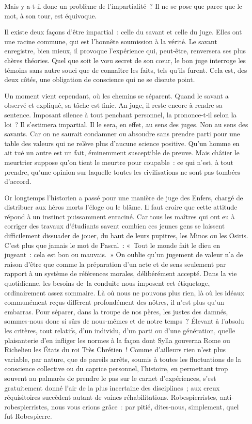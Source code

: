 \documentclass[french,twoside]{book} %
\begin{document}
\noindent  {}
\label{p69} Mais y a‑t‑il donc un problème de l’impartialité ? Il ne se pose que parce que le mot, à son tour, est équivoque.\par
Il existe deux façons d’être impartial : celle du savant et celle du juge. Elles ont une racine commune, qui est l’honnête soumission à la vérité. Le savant enregistre, bien mieux, il provoque l’expérience qui, peut‑être, renversera ses plus chères théories. Quel que soit le vœu secret de son cœur, le bon juge interroge les témoins sans autre souci que de connaître les faits, tels qu’ils furent. Cela est, des deux côtés, une obligation de conscience qui ne se discute point.\par
Un moment vient cependant, où les chemins se séparent. Quand le savant a observé et expliqué, sa tâche est finie. An juge, il reste encore à rendre sa sentence. Imposant silence à tout penchant personnel, la prononce‑t‑il selon la loi ? Il s’estimera impartial. Il le sera, en effet, au sens des juges. Non au sens des savants. Car on ne saurait condamner ou absoudre sans prendre parti pour une table des valeurs qui ne relève  
\label{p70} plus d’aucune science positive. Qu’un homme en ait tué un autre est un fait, éminemment susceptible de preuve. Mais châtier le meurtrier sup­pose qu’on tient le meurtre pour coupable : ce qui n’est, à tout prendre, qu’une opinion sur laquelle toutes les civilisations ne sont pas tombées d’accord.\par
Or longtemps l’historien a passé pour une manière de juge des Enfers, chargé de distribuer aux héros morts l’éloge ou le blâme. Il faut croire que cette attitude répond à un instinct puissamment enraciné. Car tous les maîtres qui ont eu à corriger des travaux d’étudiants savent combien ces jeunes gens se laissent difficilement dissuader de jouer, du haut de leurs pupitres, les Minos ou les Osiris. C’est plus que jamais le mot de Pascal : « Tout le monde fait le dieu en jugeant : cela est bon ou mauvais. » On oublie qu’un jugement de valeur n’a de raison d’être que comme la préparation d’un acte et de sens seulement par rapport à un système de références morales, délibérément accepté. Dans la vie quotidienne, les besoins de la conduite nous imposent cet étiquetage, ordinairement assez sommaire. Là où nous ne pouvons plus rien, là où les idéaux com­munément reçus diffèrent profondément des nôtres, il n’est plus qu’un embarras. Pour séparer, dans la troupe de nos pères, les justes des damnés, sommes‑nous donc si sûrs de nous‑mêmes et de notre temps ? Élevant à l’absolu les critères, tout relatifs, d’un individu, d’un parti ou d’une génération, quelle plaisanterie d’en infliger les normes à la façon dont Sylla gouverna Rome ou Richelieu les États du roi Très Chrétien ! Comme d’ailleurs rien n’est plus variable, par nature, que de pareils arrêts, soumis à toutes les fluctuations de la conscience collective ou du caprice personnel, l’histoire, en permettant trop souvent au palmarès de prendre le pas sur le carnet d’expériences, s’est gratuitement donné l’air de la plus incer­taine des disciplines ; aux creux réquisitoires succèdent autant de vaines réhabilitations. Robespierristes, anti-robespierristes, nous vous crions grâce : par pitié, dites‑nous, simplement, quel fut Robespierre.\par
\end{document}
